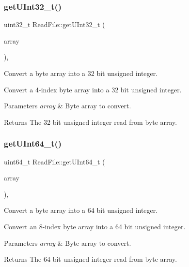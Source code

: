 \subsubsection{\texorpdfstring{get\+U\+Int32\+\_\+t()}{getUInt32\_t()}}
{\footnotesize\ttfamily uint32\+\_\+t Read\+File\+::get\+U\+Int32\+\_\+t (\begin{DoxyParamCaption}\item[{Q\+Byte\+Array $\ast$}]{array }\end{DoxyParamCaption})\hspace{0.3cm}{\ttfamily [static]}, {\ttfamily [private]}}



Convert a byte array into a 32 bit unsigned integer. 

Convert a 4-\/index byte array into a 32 bit unsigned integer. 
\begin{DoxyParams}{Parameters}
{\em array} & Byte array to convert. \\
\hline
\end{DoxyParams}
\begin{DoxyReturn}{Returns}
The 32 bit unsigned integer read from byte array. 
\end{DoxyReturn}
\mbox{\label{class_read_file_a7bbb10a200eabbc6c182ad8ba23c0ff5}} 
\subsubsection{\texorpdfstring{get\+U\+Int64\+\_\+t()}{getUInt64\_t()}}
{\footnotesize\ttfamily uint64\+\_\+t Read\+File\+::get\+U\+Int64\+\_\+t (\begin{DoxyParamCaption}\item[{Q\+Byte\+Array $\ast$}]{array }\end{DoxyParamCaption})\hspace{0.3cm}{\ttfamily [static]}, {\ttfamily [private]}}



Convert a byte array into a 64 bit unsigned integer. 

Convert an 8-\/index byte array into a 64 bit unsigned integer. 
\begin{DoxyParams}{Parameters}
{\em array} & Byte array to convert. \\
\hline
\end{DoxyParams}
\begin{DoxyReturn}{Returns}
The 64 bit unsigned integer read from byte array. 
\end{DoxyReturn}
\mbox{\label{class_read_file_ad05ef7a8f8d53305d5b58facc1c7db94}} 
